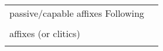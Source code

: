 \begin{table}
\begin{tabular}{ll}
                                                                                                                                                                                                                                                                                                                                                                                                                                                                                                                                \\
passive/capable affixes  Following                                                                                                                                                                                                                                                                                                                                                                                                                                                                                              \\
                                                                                                                                                                                                                                                                                                                                                                                                                                                                                                                                \\
affixes (or clitics)                                                                                                                                                                                                                                                                                                                                                                                                                                                                                                            \\
                                                                                                                                                                                                                                                                                                                                                                                                                                                                                                                                \\

\end{tabular}
\end{table}
